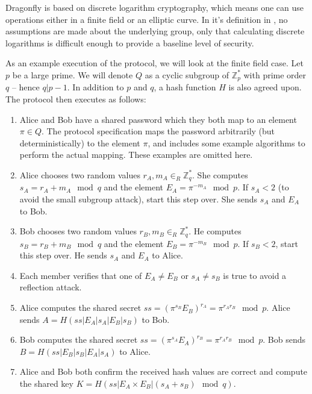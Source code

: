 
Dragonfly is based on discrete logarithm cryptography, which means one can use operations either in a finite field
or an elliptic curve. In it's definition in \cite{Ha15}, no assumptions are made about the underlying group, only that
calculating discrete logarithms is difficult enough to provide a baseline level of security.

As an example execution of the protocol, we will look at the finite field case. Let $p$ be a large prime. We will denote $Q$ as a cyclic subgroup
of $\mathbb{Z}_p^*$ with prime order $q$ -- hence $q | p-1$. In addition to $p$ and $q$, a hash function $H$ is also agreed upon.
The protocol then executes as follows:

\begin{enumerate}
    \item Alice and Bob have a shared password which they both map to an element $\pi \in Q$. The protocol specification maps the password
        arbitrarily (but deterministically) to the element $\pi$, and includes some example algorithms to perform the actual mapping. These
        examples are omitted here.
    \item Alice chooses two random values $r_A, m_A \in_R \mathbb{Z}_q^*$. She computes $s_A = r_A + m_A \mod q$ and the element
        $E_A = \pi^{-m_A} \mod p$. If $s_A < 2$ (to avoid the small subgroup attack), start this step over. She sends $s_A$ and $E_A$ to Bob.
        \label{enum:dragonfly2}
    \item Bob chooses two random values $r_B, m_B \in_R \mathbb{Z}_q^*$. He computes $s_B = r_B + m_B \mod q$ and the element
        $E_B = \pi^{-m_B} \mod p$. If $s_B < 2$, start this step over. He sends $s_A$ and $E_A$ to Alice.
        \label{enum:dragonfly3}
    \item Each member verifies that one of $E_A \neq E_B$ or $s_A \neq s_B$ is true to avoid a reflection attack.
    \item Alice computes the shared secret $ss = (\pi^{s_B} E_B)^{r_A} = \pi^{r_A r_B} \mod p$. Alice sends $A = H(ss | E_A | s_A | E_B | s_B)$ to Bob.
    \item Bob computes the shared secret $ss = (\pi^{s_A} E_A)^{r_B} = \pi^{r_A r_B} \mod p$. Bob sends $B = H(ss | E_B | s_B | E_A | s_A)$ to Alice.
    \item Alice and Bob both confirm the received hash values are correct and compute the shared key $K = H(ss | E_A \times E_B | (s_A + s_B) \mod q)$.
\end{enumerate}

